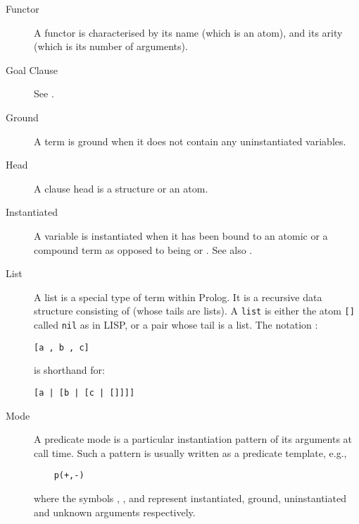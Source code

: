 \begin{description}
\item[Functor]
A functor is characterised by its name (which is an atom), and its arity
(which is its number of arguments).

\item[Goal Clause]
See .

\item[Ground]
A term is ground when it does not contain any uninstantiated variables.

\item[Head]
A clause head is a structure or an atom.

\item[Instantiated]
A variable is instantiated when it has been bound to an atomic or a
compound term as opposed to being %
or .
See also .


\item[List]
A list is a special type of term within Prolog. It is a
recursive data structure consisting of  (whose tails are lists).
A {\tt list} is either the atom {\tt []}\index{[]} called {\tt nil}
as in LISP,
or a pair whose tail is a list.
The notation :
\begin{verbatim}
[a , b , c]
\end{verbatim}
is shorthand for:
\begin{verbatim}
[a | [b | [c | []]]]
\end{verbatim}

\item[Mode]
A predicate mode is a particular instantiation pattern of its arguments
at call time.  Such a pattern is usually written as a predicate template, e.g.,
\begin{verbatim}
    p(+,-)
\end{verbatim}
where the symbols \notation{+}, \notation{++}, \notation{-} and 
represent
instantiated, ground, uninstantiated and unknown arguments respectively.


\end{description}
